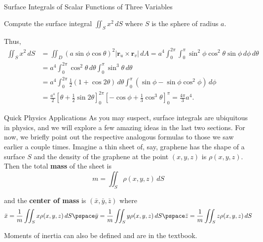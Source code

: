 \documentclass[11pt,english,
handout
]{beamer}
\begin{document}
\begin{frame}[t]{Surface Integrals of Scalar Functions of Three Variables}
\small
\begin{example}
Compute the surface integral $\iint_Sx^2\,dS$ where $S$ is the sphere of radius $a$.

\lspace
Thus,
\begin{align*}
\iint_Sx^2\,dS&=\iint_D(a\sin\phi\cos\theta)^2|\mathbf{r}_u\times\mathbf{r}_v|\,dA=a^4\int_0^{2\pi}\int_0^\pi\sin^2\phi\cos^2\theta\sin\phi\,d\phi\,d\theta\\[2mm]
&=a^4\int_0^{2\pi}\cos^2\theta\,d\theta\int_0^\pi\sin^3\theta\,d\theta\\[2mm]
&=a^4\int_0^{2\pi}\frac{1}{2}(1+\cos2\theta)\,d\theta\int_0^\pi(\sin\phi-\sin\phi\cos^2\phi)\,d\phi\\[2mm]
&=\frac{a^4}{2}\left[\theta+\frac{1}{2}\sin2\theta\right]_0^{2\pi}\left[-\cos\phi+\frac{1}{3}\cos^3\theta\right]_0^\pi=\frac{4\pi}{3}a^4.
\end{align*}
\end{example}
\end{frame}












\begin{frame}[t]{Quick Physics Applications}
\small
As you may suspect, surface integrals are ubiquitous in physics, and we will explore a few amazing ideas in the last two sections. For now, we briefly point out the respective analogous formulas to those we saw earlier a couple times. \pause Imagine a thin sheet of, say, graphene has the shape of a surface $S$ and the density of the graphene at the point $(x,y,z)$ is $\rho(x,y,z)$. \pause Then the total \textbf{mass} of the sheet is
\[
m=\iint_S\rho(x,y,z)\,dS
\]

and the \textbf{center of mass} is $(\bar{x},\bar{y},\bar{z})$ where
{\footnotesize
\[
\bar{x}=\frac{1}{m}\iint_Sx\rho(x,y,z)\,dS\pspace\bar{y}=\frac{1}{m}\iint_Sy\rho(x,y,z)\,dS\pspace\bar{z}=\frac{1}{m}\iint_Sz\rho(x,y,z)\,dS
\]}

Moments of inertia can also be defined and are in the textbook.
\end{frame}
\end{document}
